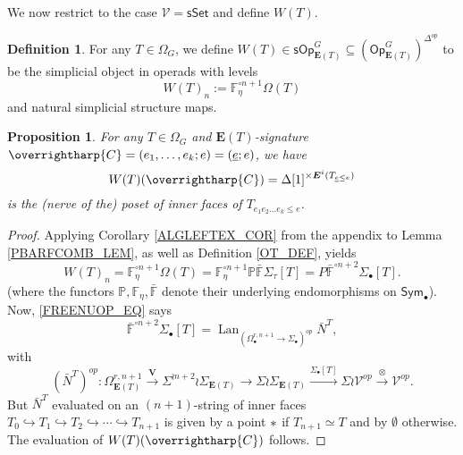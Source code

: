 \documentclass[a4paper,10pt
,draft
]{article}%
\numberwithin{equation}{section}
\numberwithin{figure}{section}
\newtheorem{proposition}[equation]{Proposition}%
\theoremstyle{definition} %
\newtheorem{definition}[equation]{Definition}%
\newcommand{\longto}{\longrightarrow}%
\newcommand{\vect}[1]{\text{\overrightharp{\ensuremath{#1}}}}
\newcommand{\Sym}{\ensuremath{\mathsf{Sym}}}%
\newcommand{\sSet}{\ensuremath{\mathsf{sSet}}}%
\newcommand{\Op}{\mathsf{Op}}%
\newcommand{\sOp}{\ensuremath{\mathsf{sOp}}}%
\DeclareMathOperator{\Lan}{Lan}%
\newcommand{\V}{\ensuremath{\mathcal V}}
\newcommand{\1}{\ensuremath{\mathbbm 1}}%
\begin{document}
We now restrict to the case $\V = \sSet$ and define $W(T)$.

\begin{definition}
      \label{WT_DEF}
      For any $T \in \Omega_G$, we define $W(T) \in \sOp_{\boldsymbol{E}(T)}^G \subseteq (\Op_{\boldsymbol{E}(T)}^G)^{\Delta^{op}}$
      to be the simplicial object in operads with levels
      \[
            W(T)_n := \mathbb F_\eta^{\circ n+1}\Omega(T)
      \]
      and natural simplicial structure maps.
\end{definition}

\begin{proposition}
      \label{WT_PROP}
      For any $T \in \Omega_G$ and $\boldsymbol{E}(T)$-signature $\vect C = (e_1, \dots, e_k; e) = (\underline{e}; e)$, we have
      \[
            W(T)(\vect C) = \Delta[1]^{\times \boldsymbol{E}^i(T_{\underline{e} \leq e})}
      \]
      is the (nerve of the) poset of inner faces of $T_{e_1 e_2 \dots e_k \leq e}$.
\end{proposition}
\begin{proof}
      Applying Corollary \ref{ALGLEFTEX_COR} from the appendix to Lemma \ref{PBARFCOMB_LEM},
      as well as Definition \ref{OT_DEF}, yields
      \begin{equation}
            \label{WT_EQ}
            W(T)_n = \mathbb F_\eta^{\circ n+1} \Omega(T)
            = \mathbb F_\eta^{\circ n+1} \mathbb P \bar{\mathbb F} \Sigma_\tau[T]
            = P \bar{\mathbb F}^{\circ n+2}\Sigma_\bullet[T].
      \end{equation}
      (where the functors $\mathbb P, \mathbb F_\eta, \bar{\mathbb F}$ denote their underlying endomorphisms on $\Sym_{\bullet}$).
      Now, \eqref{FREENUOP_EQ} says
      \[
            \bar{\mathbb F}^{\circ n+2} \Sigma_\bullet[T] = \Lan_{(\Omega_\bullet^{r,n+1}\to \Sigma_\bullet)^{op}} \bar N^{T},
      \]
      with
      \[
            \left(\bar N^{T}\right)^{op} \colon
            \Omega_{\boldsymbol E(T)}^{r, n+1} \xrightarrow{\boldsymbol{V}}
            \Sigma^{\wr n+2} \wr \Sigma_{\boldsymbol E(T)} \longto
            \Sigma \wr \Sigma_{\boldsymbol E(T)} \xrightarrow{\Sigma_\bullet[T]}
            \Sigma \wr \V^{op} \xrightarrow{\otimes}
            \V^{op}.
      \]
      But $\bar N^T$ evaluated on an $(n+1)$-string of inner faces
      $T_0 \hookrightarrow T_1 
      \hookrightarrow T_2 
      \hookrightarrow \cdots
      \hookrightarrow T_{n+1}$
      is given by a point $\**$
      if $T_{n+1} \simeq T$
      and by $\emptyset$ otherwise.
      The evaluation of $W(T)(\vect C)$ follows.
\end{proof}
\end{document}
